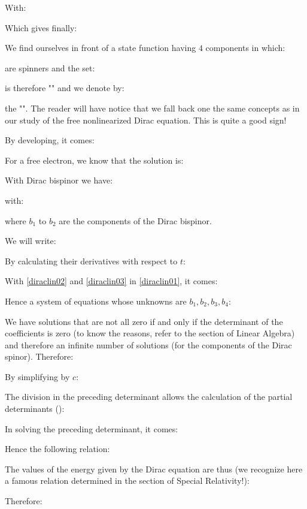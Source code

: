 	With:
	
	Which gives finally:
	
	We find ourselves in front of a state function having $4$ components in which:
	
	are spinners and the set:
	
	is therefore "" and we denote by:
	
	the "". The reader will have notice that we fall back one the same concepts as in our study of the free nonlinearized Dirac equation. This is quite a good sign!
	
	By developing, it comes:
	
	For a free electron, we know that the solution is:
	
	With Dirac bispinor we have:
	
	with:
	
	where $b_1$ to $b_2$ are the components of the Dirac bispinor.
	
	We will write:
	
	By calculating their derivatives with respect to $t$:
	
	With \eqref{diraclin02} and \eqref{diraclin03} in \eqref{diraclin01}, it comes:
	
	Hence a system of equations whose unknowns are $b_1,b_2,b_3,b_4$:
	
	We have solutions that are not all zero if and only if the determinant of the coefficients is zero (to know the reasons, refer to the section of Linear Algebra) and therefore an infinite number of solutions (for the components of the Dirac spinor). Therefore:
	
	By simplifying by $c$:
	
	The division in the preceding determinant allows the calculation of the partial determinants ():
	
	In solving the preceding determinant, it comes:
	
	Hence the following relation:
	
	The values of the energy given by the Dirac equation are thus (we recognize here a famous relation determined in the section of Special Relativity!):
	
	Therefore:
	
